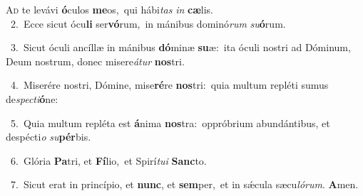 \lettrine{\initial\textcolor{\initialcolor}{A}}{d} te levávi \textbf{ó}\-culos \textbf{me}\-os,~\star qui hábi\textit{tas} \textit{in} \textbf{cæ}\-lis.\\
{\numbfont\textcolor{\numbcolor}{~2.}}~Ecce sicut ócu\textbf{li} ser\-\textbf{vó}\-rum,~\star in mánibus dominó\textit{rum} \textit{su}\-\textbf{ó}rum.\par
{\numbfont\textcolor{\numbcolor}{~3.}}~Sicut óculi ancíllæ in mánibus \textbf{dó}\-minæ \textbf{su}\-æ:~\star ita óculi nostri ad Dóminum, Deum nostrum, donec misere\-\textit{á}\-\textit{tur} \textbf{nos}\-tri.\par
{\numbfont\textcolor{\numbcolor}{~4.}}~Miserére nostri, Dómine, mise\-\textbf{ré}\-re \textbf{nos}\-tri:~\star quia multum repléti sumus de\-\textit{spec}\-\textit{ti}\textbf{ó}ne:\par
{\numbfont\textcolor{\numbcolor}{~5.}}~Quia multum repléta est \textbf{á}\-nima \textbf{nos}\-tra:~\star oppróbrium abundántibus, et despécti\textit{o} \textit{su}\-\textbf{pér}bis.\par
{\numbfont\textcolor{\numbcolor}{~6.}}~Glória \textbf{Pa}\-tri, et \textbf{Fí}\-lio,~\star et Spirí\-\textit{tu}\-\textit{i} \textbf{Sanc}\-to.\par
{\numbfont\textcolor{\numbcolor}{~7.}}~Sicut erat in princípio, et \textbf{nunc}\-, et \textbf{sem}\-per,~\star et in sǽcula sæcu\-\textit{ló}\-\textit{rum}. \textbf{A}\-men.\par
